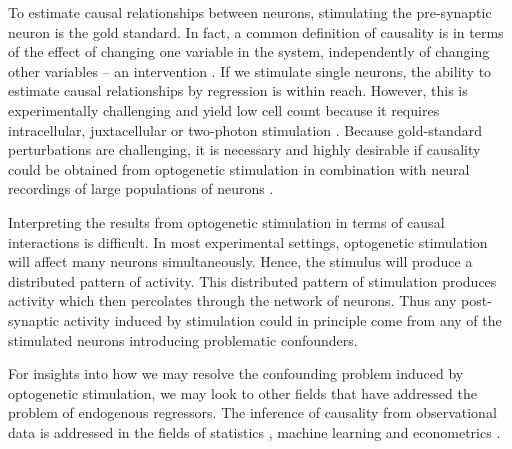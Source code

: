 \documentclass[11pt]{article}
\begin{document}
To estimate causal relationships between neurons, stimulating the pre-synaptic neuron is the gold standard. 
In fact, a common definition of causality is in terms of the effect of changing one variable in the system, independently of changing other variables -- an intervention \citep{pearl2009causality}. 
If we stimulate single neurons, the ability to estimate causal relationships by regression is within reach. 
However, this is experimentally challenging and yield low cell count because it requires intracellular, juxtacellular or two-photon stimulation \citep{pinault1996novel, lerman2017two, nikolenko2007two, emiliani2015all}. 
Because gold-standard perturbations are challenging, it is necessary and highly desirable if causality could be obtained from optogenetic stimulation in combination with neural recordings of large populations of neurons \citep{boyden2005millisecond, zemelman2002selective}.

Interpreting the results from optogenetic stimulation in terms of causal interactions is difficult. 
In most experimental settings, optogenetic stimulation will affect many neurons simultaneously. 
Hence, the stimulus will produce a distributed pattern of activity.
This distributed pattern of stimulation produces activity which then percolates through the network of neurons. 
Thus any post-synaptic activity induced by stimulation could in principle come from any of the stimulated neurons introducing problematic confounders.

For insights into how we may resolve the confounding problem induced by optogenetic stimulation, we may look to other fields that have addressed the problem of endogenous regressors. 
The inference of causality from observational data is addressed in the fields of statistics \citep{pearl2009causality}, machine learning \citep{peters2017elements} and econometrics \citep{angrist2008mostly}. 
\end{document}
